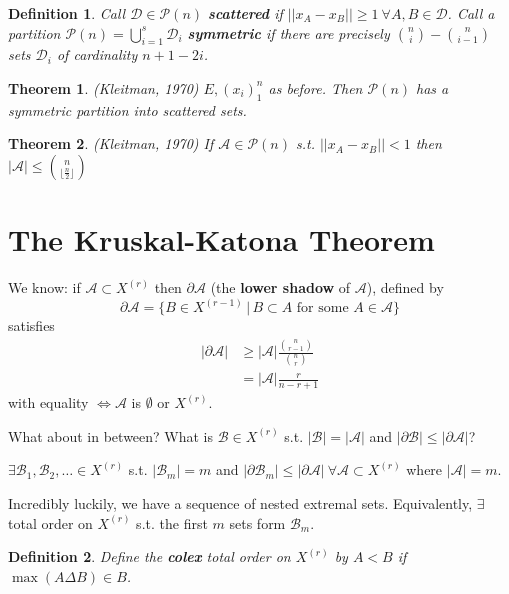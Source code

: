 \documentclass[a4paper]{article}
\newtheorem*{definition}{Definition}
\newtheorem{theorem}{Theorem}
\newcommand*\abs[1]{\left|#1\right|}
\newcommand*\norm[1]{\abs{\abs{#1}}}
\begin{document}
\begin{definition}
	Call $\mathcal{D} \in \mathcal{P}(n)$ \textbf{scattered} if $\norm{x_A - x_B} \geq 1 \ \forall A,B \in \mathcal{D}$.
	Call a partition $\mathcal{P}(n) = \bigcup_{i=1}^s \mathcal{D}_i$ \textbf{symmetric}
	if there are precisely ${n \choose i} - {n \choose i-1}$ sets $\mathcal{D}_i$ of cardinality $n+1-2i$.
\end{definition}

\begin{theorem}(Kleitman, 1970)
	$E, (x_i)_1^n$ as before. Then $\mathcal{P}(n)$ has a symmetric partition into scattered sets.
\end{theorem}

\begin{theorem}(Kleitman, 1970)
	If $\mathcal{A} \in \mathcal{P}(n)$ s.t. $\norm{x_A-x_B} < 1$ then $\abs{\mathcal{A}} \leq {n \choose {\lfloor\frac{n}{2}\rfloor}}$
\end{theorem}

\section{The Kruskal-Katona Theorem}
\setcounter{theorem}{0}
We know: if $\mathcal{A} \subset X^{(r)}$ then $\partial \mathcal{A}$ (the \textbf{lower shadow} of $\mathcal{A}$),
defined by $$\partial \mathcal{A} = \{B \in X^{(r-1)} \,|\, B \subset A \text{ for some } A \in \mathcal{A}\}$$ satisfies
\begin{align*}
\abs{\partial \mathcal{A}} &\geq \abs{\mathcal{A}} \frac{{n \choose r-1}}{{n \choose r}} \\
&= \abs{\mathcal{A}}\frac{r}{n-r+1}
\end{align*}
with equality $\iff \mathcal{A}$ is $\emptyset$ or $X^{(r)}$.

What about in between?
What is $\mathcal{B} \in X^{(r)}$ s.t. $\abs{\mathcal{B}} = \abs{\mathcal{A}}$ and $\abs{\partial\mathcal{B}} \leq \abs{\partial\mathcal{A}}$?

$\exists \mathcal{B}_1, \mathcal{B}_2, \dots \in X^{(r)}$ s.t. $\abs{\mathcal{B}_m} = m$ and $\abs{\partial \mathcal{B}_m} \leq \abs{\partial \mathcal{A}} \ \forall \mathcal{A} \subset X^{(r)}$ where $\abs{\mathcal{A}} = m$.

Incredibly luckily, we have a sequence of nested extremal sets.
Equivalently, $\exists$ total order on $X^{(r)}$ s.t. the first $m$ sets form $\mathcal{B}_m$.

\begin{definition}
	Define the \textbf{colex} total order on $X^{(r)}$ by $A<B$ if $\max(A \Delta B) \in B$.
\end{definition}
\end{document}
